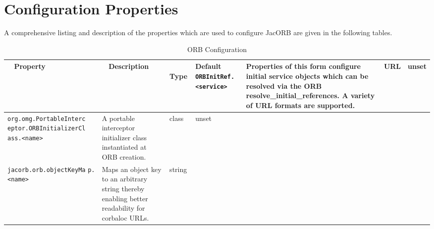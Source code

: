 {{\section{Configuration Properties}

A comprehensive listing and description of the properties which are used
to configure JacORB are given in the following tables.

\begin{small}
\begin{longtable}{|p{5cm}|p{7.5cm}|p{1.5cm}|p{1.5cm}|}
\caption{ORB Configuration}\\
\hline
~ \hfill \textbf {Property} \hfill ~ & ~ \hfill \textbf {Description}
\hfill ~ & ~ \hfill \textbf {Type} \hfill ~ & \hfill \textbf{Default} \endhead
\hline
\verb"ORBInitRef.<service>" & Properties of this form configure
initial service objects which can be resolved via the ORB
resolve\_initial\_references. A variety of URL formats are
supported. & URL & unset \\
\hline
\verb"org.omg.PortableInterc"
\verb"eptor.ORBInitializerCl"
\verb"ass.<name>" & A portable interceptor initializer class
instantiated at ORB creation. & class & unset \\
\hline
\verb"jacorb.orb.objectKeyMa"
\verb"p.<name>" & Maps an object key to an arbitrary string thereby
enabling better readability for corbaloc URLs. & string & \\
\hline


\end{longtable}
\end{small}}}
